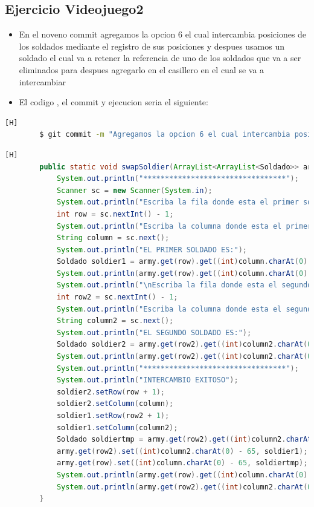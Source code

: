 \documentclass{article}
\begin{document}
	\subsection{Ejercicio Videojuego2}
	\begin{itemize}	
		\item En el noveno commit agregamos la opcion 6 el cual intercambia posiciones de los soldados mediante el registro de sus posiciones y despues usamos un soldado el cual va a retener la referencia de uno de los soldados que va a ser eliminados para despues agregarlo en el casillero en el cual se va a intercambiar
		\item El codigo , el commit y ejecucion seria el siguiente:
	\end{itemize}	
	\begin{lstlisting}[language=bash,caption={Commit}][H]
		$ git commit -m "Agregamos la opcion 6 el cual intercambia posiciones de los soldados mediante el registro de sus posiciones y despues usamos un soldado el cual va a retener la referencia de uno de los soldados que va a ser eliminados para despues agregarlo en el casillero en el cual se va a intercambiar"
	\end{lstlisting}	
	\begin{lstlisting}[language=java,caption={Las lineas de codigos del metodo creado:}][H]
		public static void swapSoldier(ArrayList<ArrayList<Soldado>> army){
			System.out.println("*********************************");
			Scanner sc = new Scanner(System.in);
			System.out.println("Escriba la fila donde esta el primer soldado que va intercambiar de posicion:");
			int row = sc.nextInt() - 1;
			System.out.println("Escriba la columna donde esta el primer soldado que va intercambiar de posicion:");
			String column = sc.next();
			System.out.println("EL PRIMER SOLDADO ES:");
			Soldado soldier1 = army.get(row).get((int)column.charAt(0) - 65);
			System.out.println(army.get(row).get((int)column.charAt(0) - 65).toString());
			System.out.println("\nEscriba la fila donde esta el segundo soldado que va intercambiar de posicion:");
			int row2 = sc.nextInt() - 1;
			System.out.println("Escriba la columna donde esta el segundo soldado que va intercambiar de posicion:");
			String column2 = sc.next();
			System.out.println("EL SEGUNDO SOLDADO ES:");
			Soldado soldier2 = army.get(row2).get((int)column2.charAt(0) - 65);
			System.out.println(army.get(row2).get((int)column2.charAt(0) - 65).toString());
			System.out.println("*********************************");
			System.out.println("INTERCAMBIO EXITOSO");
			soldier2.setRow(row + 1);
			soldier2.setColumn(column);
			soldier1.setRow(row2 + 1);
			soldier1.setColumn(column2);
			Soldado soldiertmp = army.get(row2).get((int)column2.charAt(0) - 65);
			army.get(row2).set((int)column2.charAt(0) - 65, soldier1);
			army.get(row).set((int)column.charAt(0) - 65, soldiertmp);
			System.out.println(army.get(row).get((int)column.charAt(0) - 65).toString());
			System.out.println(army.get(row2).get((int)column2.charAt(0) - 65).toString());
		}
	\end{lstlisting}
\end{document}
